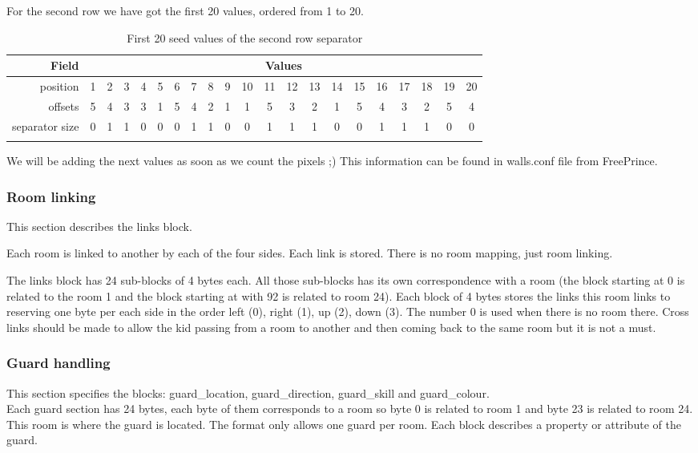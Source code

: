\documentclass{article}
\begin{document}
 For the second row we have got the first 20 values, ordered from 1 to 20. \\ 
\renewcommand{\tabcolsep}{0.1em}
\begin{longtable}{r@{\hspace{1cm}}cccccccccccccccccccc}
  \hline
 Field      & \multicolumn{20}{c}{Values} \\
  \hline
 \endfirsthead
 position&        1&2&3&4&5&6&7&8&9&10&11&12&13&14&15&16&17&18&19&20 \\
 offsets&        5&4&3&3&1&5&4&2&1& 1& 5& 3& 2& 1& 5& 4& 3& 2& 5& 4 \\
 separator size& 0&1&1&0&0&0&1&1&0& 0& 1& 1& 1& 0& 0& 1& 1& 1& 0& 0 \\
\hline
\caption{First 20 seed values of the second row separator}
\label{seedss}
\end{longtable}

 We will be adding the next values as soon as we count the pixels ;)
 This information can be found in walls.conf file from FreePrince.

\subsubsection{Room linking \label{room linking}} %
 This section describes the links block.

 Each room is linked to another by each of the four sides. Each link
 is stored. There is no room mapping, just room linking.

 The links block has 24 sub-blocks of 4 bytes each. All those sub-blocks
 has its own correspondence with a room (the block starting at 0 is
 related to the room 1 and the block starting at with 92 is related to
 room 24).
 Each block of 4 bytes stores the links this room links to reserving one
 byte per each side in the order left (0), right (1), up (2), down (3).
 The number 0 is used when there is no room there.
 Cross links should be made to allow the kid passing from a room to
 another and then coming back to the same room but it is not a must.

\subsubsection{Guard handling\label{guard handling}} %
 This section specifies the blocks: guard\_location, guard\_direction,
 guard\_skill and guard\_colour.\\

 Each guard section has 24 bytes, each byte of them corresponds to a room
 so byte 0 is related to room 1 and byte 23 is related to room 24.
 This room is where the guard is located. The format only allows one
 guard per room. Each block describes a property or attribute of the guard.\\
\end{document}
